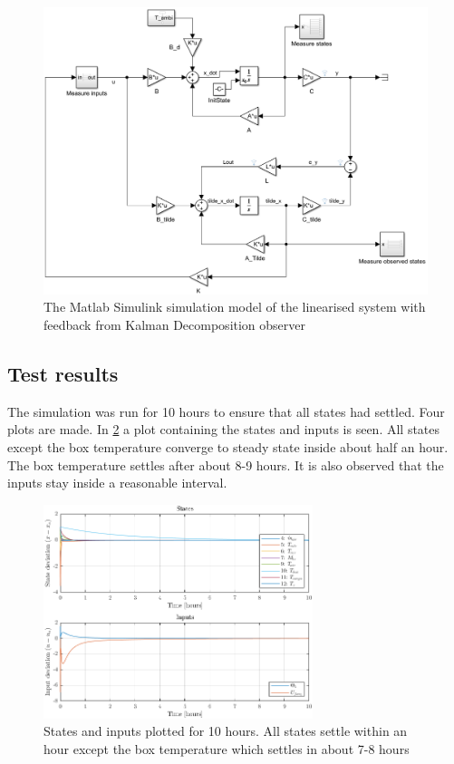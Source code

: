 \begin{figure}[h!]
	\centering
	\includegraphics[width=1\textwidth]{Graphics/fig_modelSS_obs.png}
	\caption{The Matlab Simulink simulation model of the linearised system with feedback from Kalman Decomposition observer}
	\label{fig:sim_modelSS_obs}
\end{figure}

\newpage
\subsection{Test results}
The simulation was run for 10 hours to ensure that all states had settled. Four plots are made. In \cref{fig:sim_stateInput10h} a plot containing the states and inputs is seen. All states except the box temperature converge to steady state inside about half an hour. The box temperature settles after about 8-9 hours. It is also observed that the inputs stay inside a reasonable interval.

\begin{figure}[h!]
	\centering
	\includegraphics[width=00.7\textwidth]{Graphics/fig_stateInput10h.png}
	\caption{States and inputs plotted for 10 hours. All states settle within an hour except the box temperature which settles in about 7-8 hours}
	\label{fig:sim_stateInput10h}
\end{figure}

